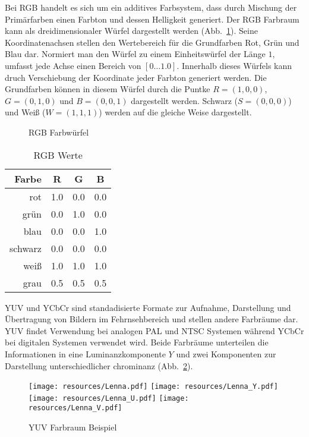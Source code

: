 Bei RGB handelt es sich um ein additives Farbsystem, dass durch Mischung der Primärfarben einen Farbton und dessen Helligkeit generiert. Der RGB Farbraum kann als dreidimensionaler Würfel dargestellt werden (Abb.~\ref{fig:rgbWuerfel}). Seine Koordinatenachsen stellen den Wertebereich für die Grundfarben Rot, Grün und Blau dar. Normiert man den Würfel zu einem Einheitswürfel der Länge $1$, umfasst jede Achse einen Bereich von \(\left[0 \dotsc 1.0\right]\). Innerhalb dieses Würfels kann druch Verschiebung der Koordinate jeder Farbton generiert werden. Die Grundfarben können in diesem Würfel durch die Puntke $R = \left(1,0,0\right)$, $G = \left(0,1,0\right)$ und $B = \left(0,0,1\right)$ dargestellt werden. Schwarz ($S = \left(0,0,0\right)$) und Weiß ($W = \left(1,1,1\right)$) werden auf die gleiche Weise dargestellt.

\begin{figure}[!ht]
	\centering
	\def\svgwidth{.2\columnwidth}
	
	\caption{RGB Farbwürfel}
	\label{fig:rgbWuerfel}
\end{figure}

\begin{table}[!ht]
	\begin{center}
	\begin{tabular}[]{r|c|c|c}
	Farbe & R & G & B \\ \hline\hline
	rot & 1.0 & 0.0 & 0.0 \\
	grün & 0.0 & 1.0 & 0.0 \\
	blau & 0.0 & 0.0 & 1.0 \\
	schwarz & 0.0 & 0.0 & 0.0 \\
	weiß & 1.0 & 1.0 & 1.0 \\
	grau & 0.5 & 0.5 & 0.5 \\
	\end{tabular}
	\caption{RGB Werte}
 	\label{tbl:rgbwerte}
	\end{center}
\end{table}

YUV und YCbCr sind standadisierte Formate zur Aufnahme, Darstellung und Übertragung von Bildern im Fehrnsehbereich und stellen andere Farbräume dar. YUV findet Verwendung bei analogen PAL und NTSC Systemen während YCbCr bei digitalen Systemen verwendet wird. Beide Farbräume unterteilen die Informationen in eine Luminanzkomponente $Y$ und zwei Komponenten zur Darstellung unterschiedlicher \gls{chrominanz} (Abb.~\ref{fig:yuvLenna}).

\begin{figure}[!ht]
	\centering
	\texttt{[image: resources/Lenna.pdf]}
	\texttt{[image: resources/Lenna\_Y.pdf]}
	\texttt{[image: resources/Lenna\_U.pdf]}
	\texttt{[image: resources/Lenna\_V.pdf]}
	\caption{YUV Farbraum Beispiel}
	\label{fig:yuvLenna}
\end{figure}

